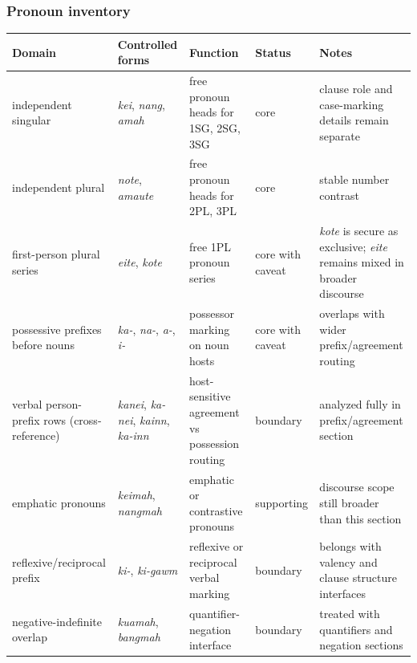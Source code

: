 \documentclass[
  11pt,
  a4paper,
]{article}
\newcounter{none} %
\newcommand{\tdim}[1]{\textit{#1}}
\begin{document}
\subsubsection{Pronoun inventory}\label{pronoun-inventory}

{\def\LTcaptype{none} %
\begin{longtable}[]{@{}
  >{\raggedright\arraybackslash}p{}
  >{\raggedright\arraybackslash}p{}
  >{\raggedright\arraybackslash}p{}
  >{\raggedright\arraybackslash}p{}
  >{\raggedright\arraybackslash}p{}@{}}
\toprule\noalign{}
\begin{minipage}[b]{\linewidth}\raggedright
Domain
\end{minipage} & \begin{minipage}[b]{\linewidth}\raggedright
Controlled forms
\end{minipage} & \begin{minipage}[b]{\linewidth}\raggedright
Function
\end{minipage} & \begin{minipage}[b]{\linewidth}\raggedright
Status
\end{minipage} & \begin{minipage}[b]{\linewidth}\raggedright
Notes
\end{minipage} \\
\midrule\noalign{}
\endhead
\bottomrule\noalign{}
\endlastfoot
independent singular & \tdim{kei}, \tdim{nang}, \tdim{amah} & free
pronoun heads for 1SG, 2SG, 3SG & core & clause role and case-marking
details remain separate \\
independent plural & \tdim{note}, \tdim{amaute} & free pronoun heads for
2PL, 3PL & core & stable number contrast \\
first-person plural series & \tdim{eite}, \tdim{kote} & free 1PL pronoun
series & core with caveat & \tdim{kote} is secure as exclusive;
\tdim{eite} remains mixed in broader discourse \\
possessive prefixes before nouns & \tdim{ka-}, \tdim{na-}, \tdim{a-},
\tdim{i-} & possessor marking on noun hosts & core with caveat &
overlaps with wider prefix/agreement routing \\
verbal person-prefix rows (cross-reference) & \tdim{kanei},
\tdim{ka-nei}, \tdim{kainn}, \tdim{ka-inn} & host-sensitive agreement vs
possession routing & boundary & analyzed fully in prefix/agreement
section \\
emphatic pronouns & \tdim{keimah}, \tdim{nangmah} & emphatic or
contrastive pronouns & supporting & discourse scope still broader than
this section \\
reflexive/reciprocal prefix & \tdim{ki-}, \tdim{ki-gawm} & reflexive or
reciprocal verbal marking & boundary & belongs with valency and clause
structure interfaces \\
negative-indefinite overlap & \tdim{kuamah}, \tdim{bangmah} &
quantifier-negation interface & boundary & treated with quantifiers and
negation sections \\
\end{longtable}
}
\end{document}
